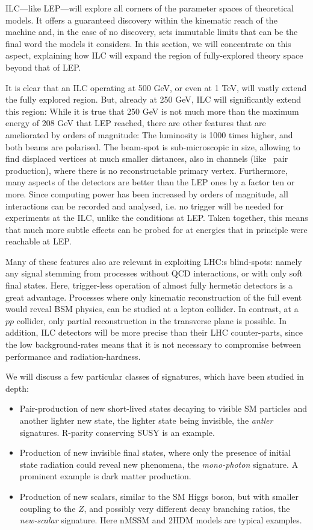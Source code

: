 ILC---like LEP---will explore all corners of the parameter spaces of
theoretical models.   It offers a guaranteed discovery within the
kinematic reach of the machine and, in the case of no discovery, sets
immutable limits that can be the final word the models it considers.
In this section, we will concentrate on this aspect, explaining how
ILC will expand the region of fully-explored theory space beyond
that of LEP.


It is clear that an ILC operating at 500 GeV, or even at 1 TeV,
will vastly extend the fully explored region.
But, already at 250 GeV, ILC will significantly extend this region:
While it is true that 250 GeV is not much more than the maximum 
energy of 208 GeV that LEP reached,
there are other features that are
ameliorated by orders of magnitude: 
The luminosity is 1000 times higher,
and both beams are  polarised.
The beam-spot is sub-microscopic in size, allowing to find 
displaced vertices at much smaller distances, also in channels 
(like \stau~pair production),
where there is no reconstructable primary vertex.
Furthermore, 
many aspects of the detectors are better than the LEP ones by a 
factor ten or more.
Since computing power has been increased by orders of magnitude,
all interactions can be recorded and analysed, 
i.e.
no trigger will be needed for experiments at the ILC, 
unlike the conditions at LEP.
Taken together, this means that much more subtle effects
can be probed for at energies that in principle were reachable at LEP.

Many of these features also are relevant in exploiting LHC:s blind-spots: 
namely any signal stemming from processes without QCD interactions,
or with only soft final states.
Here, trigger-less operation of almost fully hermetic detectors
is a great advantage.
Processes where only kinematic reconstruction of the full event
would reveal BSM physics,
can be studied at a lepton collider. 
In contrast, 
at a $pp$ collider, only partial reconstruction 
in the transverse plane is possible.
In addition,
ILC detectors will be more precise than their LHC counter-parts,
since the low background-rates means that it is not necessary
to compromise between performance and radiation-hardness.

We will discuss a few particular classes of signatures,
which have been studied in depth:
\begin{itemize}
\item Pair-production of new short-lived states decaying to visible
  SM particles and another lighter new state, the lighter
  state being invisible, the {\it antler} signatures.
  R-parity conserving SUSY is an example.
\item Production of new invisible final states, where only the presence
  of initial state radiation could reveal new phenomena,
  the {\it mono-photon} signature.
  A prominent example is dark matter production.
\item Production of new scalars, similar to the SM Higgs boson, but with smaller
  coupling to the $Z$, and possibly very different decay
  branching ratios, the {\it new-scalar} signature.
  Here nMSSM and 2HDM models are typical examples.
\end{itemize}



